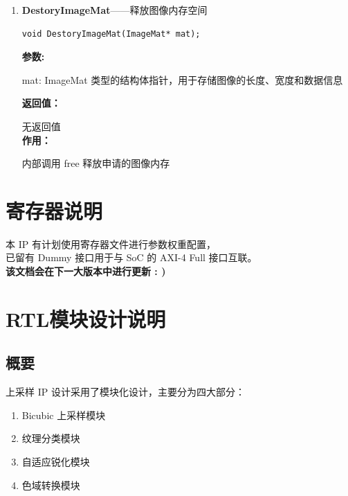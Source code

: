 \documentclass[12pt, a4paper, oneside]{ctexbook}
\begin{document}
\begin{enumerate}
			\item \textbf{DestoryImageMat}——释放图像内存空间
			\begin{lstlisting}[numbers=none]
void DestoryImageMat(ImageMat* mat);
			\end{lstlisting}
			\textbf{参数:} \par mat: ImageMat 类型的结构体指针，用于存储图像的长度、宽度和数据信息\par 
			\textbf{返回值：}\par 无返回值 \\
			\textbf{作用：}\par 内部调用 free 释放申请的图像内存 \\					
		\end{enumerate}

		\chapter{寄存器说明}
		\newpage
		\begin{center}
			本 IP 有计划使用寄存器文件进行参数权重配置，\\
			已留有 Dummy 接口用于与 SoC 的 AXI-4 Full 接口互联。\\
			\textbf{该文档会在下一大版本中进行更新 : )}
		\end{center}
	
	\chapter{RTL模块设计说明}
	\section{概要}
	上采样 IP 设计采用了模块化设计，主要分为四大部分：
	\begin{enumerate}
		\item Bicubic 上采样模块
		\item 纹理分类模块
		\item 自适应锐化模块
		\item 色域转换模块
	\end{enumerate}
	
\end{document}

